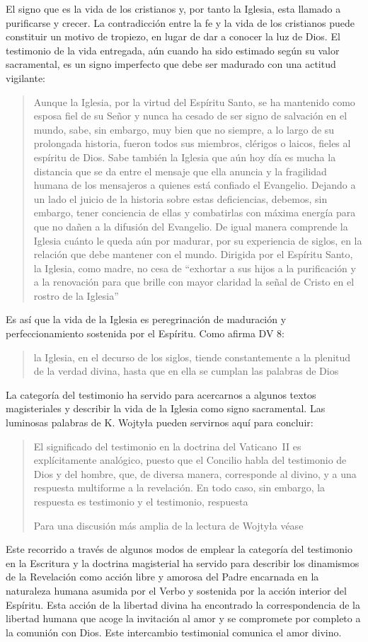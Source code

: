 El signo que es la vida de los cristianos y, por tanto la Iglesia, esta llamado a purificarse y crecer. La contradicción entre la fe y la vida de los cristianos puede constituir un motivo de tropiezo, en lugar de dar a conocer la luz de Dios. El testimonio de la vida entregada, aún cuando ha sido estimado según su valor sacramental, es un signo imperfecto que debe ser madurado con una actitud vigilante: \blockquote[][\,(GS 34)]{Aunque la Iglesia, por la virtud del Espíritu Santo, se ha mantenido como esposa fiel de su Señor y nunca ha cesado de ser signo de salvación en el mundo, sabe, sin embargo, muy bien que no siempre, a lo largo de su prolongada historia, fueron todos sus miembros, clérigos o laicos, fieles al espíritu de Dios. Sabe también la Iglesia que aún hoy día es mucha la distancia que se da entre el mensaje que ella anuncia y la fragilidad humana de los mensajeros a quienes está confiado el Evangelio. Dejando a un lado el juicio de la historia sobre estas deficiencias, debemos, sin embargo, tener conciencia de ellas y combatirlas con máxima energía para que no dañen a la difusión del Evangelio. De igual manera comprende la Iglesia cuánto le queda aún por madurar, por su experiencia de siglos, en la relación que debe mantener con el mundo. Dirigida por el Espíritu Santo, la Iglesia, como madre, no cesa de ``exhortar a sus hijos a la purificación y a la renovación para que brille con mayor claridad la señal de Cristo en el rostro de la Iglesia''}. Es así que la vida de la Iglesia es peregrinación de maduración y perfeccionamiento sostenida por el Espíritu. Como afirma DV 8: \blockquote{la Iglesia, en el decurso de los siglos, tiende constantemente a la plenitud de la verdad divina, hasta que en ella se cumplan las palabras de Dios}.

La categoría del testimonio ha servido para acercarnos a algunos textos magisteriales y describir la vida de la Iglesia como signo sacramental. Las luminosas palabras de K. Wojtyła pueden servirnos aquí para concluir: \blockquote[Para una discusión más amplia de la lectura de Wojtyła véase {\cite[194-197]{prades2015testimonio}}]{El significado del testimonio en la doctrina del Vaticano~II es explícitamente analógico, puesto que el Concilio habla del testimonio de Dios y del hombre, que, de diversa manera, corresponde al divino, y a una respuesta multiforme a la revelación. En todo caso, sin embargo, la respuesta es testimonio y el testimonio, respuesta}.

Este recorrido a través de algunos modos de emplear la categoría del testimonio en la Escritura y la doctrina magisterial ha servido para describir los dinamismos de la Revelación como acción libre y amorosa del Padre encarnada en la naturaleza humana asumida por el Verbo y sostenida por la acción interior del Espíritu. Esta acción de la libertad divina ha encontrado la correspondencia de la libertad humana que acoge la invitación al amor y se compromete por completo a la comunión con Dios. Este intercambio testimonial comunica el amor divino.
